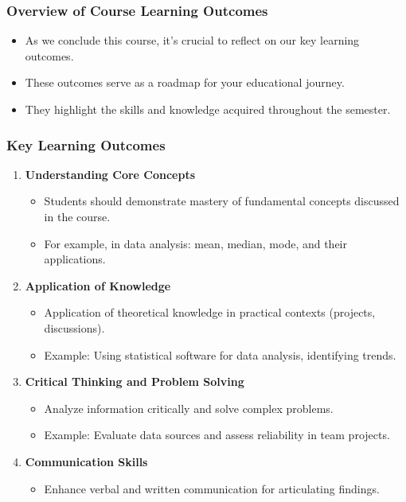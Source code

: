 \documentclass[aspectratio=169]{beamer}
\begin{document}
\begin{frame}[fragile]
    \frametitle{Overview of Course Learning Outcomes}
    \begin{itemize}
        \item As we conclude this course, it's crucial to reflect on our key learning outcomes.
        \item These outcomes serve as a roadmap for your educational journey.
        \item They highlight the skills and knowledge acquired throughout the semester.
    \end{itemize}
\end{frame}

\begin{frame}[fragile]
    \frametitle{Key Learning Outcomes}
    \begin{enumerate}
        \item \textbf{Understanding Core Concepts}
            \begin{itemize}
                \item Students should demonstrate mastery of fundamental concepts discussed in the course.
                \item For example, in data analysis: mean, median, mode, and their applications.
            \end{itemize}
        \item \textbf{Application of Knowledge}
            \begin{itemize}
                \item Application of theoretical knowledge in practical contexts (projects, discussions).
                \item Example: Using statistical software for data analysis, identifying trends.
            \end{itemize}
        \item \textbf{Critical Thinking and Problem Solving}
            \begin{itemize}
                \item Analyze information critically and solve complex problems.
                \item Example: Evaluate data sources and assess reliability in team projects.
            \end{itemize}
        \item \textbf{Communication Skills}
            \begin{itemize}
                \item Enhance verbal and written communication for articulating findings.

\end{itemize}
\end{enumerate}
\end{frame}
\end{document}

